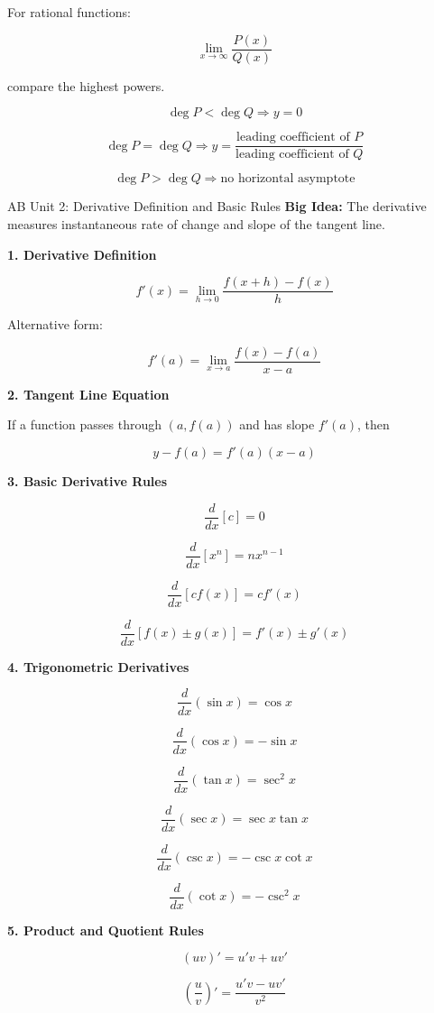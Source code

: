 \documentclass[11pt]{article}
\newcommand{\subtopic}[1]{
\vspace{0.45em}
\textcolor{novelPurpleDark}{\textbf{#1}}
}
\begin{document}
For rational functions:

\[
\lim_{x\to\infty}\frac{P(x)}{Q(x)}
\]

compare the highest powers.

\[
\deg P<\deg Q \Rightarrow y=0
\]

\[
\deg P=\deg Q \Rightarrow y=\frac{\text{leading coefficient of }P}{\text{leading coefficient of }Q}
\]

\[
\deg P>\deg Q \Rightarrow \text{no horizontal asymptote}
\]

\newpage

\begin{unitbox}{AB Unit 2: Derivative Definition and Basic Rules}
\textbf{Big Idea:} The derivative measures instantaneous rate of change and slope of the tangent line.
\end{unitbox}

\subtopic{1. Derivative Definition}

\[
f'(x)=\lim_{h\to0}\frac{f(x+h)-f(x)}{h}
\]

Alternative form:

\[
f'(a)=\lim_{x\to a}\frac{f(x)-f(a)}{x-a}
\]

\subtopic{2. Tangent Line Equation}

If a function passes through \((a,f(a))\) and has slope \(f'(a)\), then

\[
y-f(a)=f'(a)(x-a)
\]

\subtopic{3. Basic Derivative Rules}

\[
\frac{d}{dx}[c]=0
\]

\[
\frac{d}{dx}[x^n]=nx^{n-1}
\]

\[
\frac{d}{dx}[cf(x)]=cf'(x)
\]

\[
\frac{d}{dx}[f(x)\pm g(x)]=f'(x)\pm g'(x)
\]

\subtopic{4. Trigonometric Derivatives}

\[
\frac{d}{dx}(\sin x)=\cos x
\]

\[
\frac{d}{dx}(\cos x)=-\sin x
\]

\[
\frac{d}{dx}(\tan x)=\sec^2 x
\]

\[
\frac{d}{dx}(\sec x)=\sec x\tan x
\]

\[
\frac{d}{dx}(\csc x)=-\csc x\cot x
\]

\[
\frac{d}{dx}(\cot x)=-\csc^2 x
\]

\subtopic{5. Product and Quotient Rules}

\[
(uv)'=u'v+uv'
\]

\[
\left(\frac{u}{v}\right)'=\frac{u'v-uv'}{v^2}
\]
\end{document}
